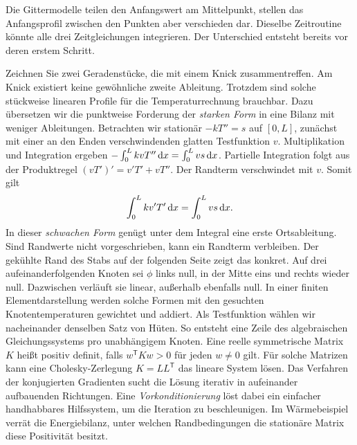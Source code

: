 Die Gittermodelle teilen den Anfangswert am Mittelpunkt, stellen das Anfangsprofil zwischen den Punkten aber verschieden dar. Dieselbe Zeitroutine könnte alle drei Zeitgleichungen integrieren. Der Unterschied entsteht bereits vor deren erstem Schritt.

Zeichnen Sie zwei Geradenstücke, die mit einem Knick zusammentreffen. Am Knick existiert keine gewöhnliche zweite Ableitung. Trotzdem sind solche stückweise linearen Profile für die Temperaturrechnung brauchbar. Dazu übersetzen wir die punktweise Forderung der \emph{starken Form} in eine Bilanz mit weniger Ableitungen.
Betrachten wir stationär \(-kT''=s\) auf \([0,L]\), zunächst mit einer an den Enden verschwindenden glatten Testfunktion \(v\). Multiplikation und Integration ergeben \(-\int_0^L kvT''\,\mathrm{d} x=\int_0^L vs\,\mathrm{d} x\). Partielle Integration folgt aus der Produktregel \((vT')'=v'T'+vT''\). Der Randterm verschwindet mit \(v\). Somit gilt
\[
 \int_0^L k v'T'\,\mathrm{d} x=\int_0^L vs\,\mathrm{d} x .
\]
In dieser \emph{schwachen Form} genügt unter dem Integral eine erste Ortsableitung. Sind Randwerte nicht vorgeschrieben, kann ein Randterm verbleiben. Der gekühlte Rand des Stabs auf der folgenden Seite zeigt das konkret.
Auf drei aufeinanderfolgenden Knoten sei \(\phi\) links null, in der Mitte eins und rechts wieder null. Dazwischen verläuft sie linear, außerhalb ebenfalls null. In einer finiten Elementdarstellung werden solche Formen mit den gesuchten Knotentemperaturen gewichtet und addiert. Als Testfunktion wählen wir nacheinander denselben Satz von Hüten. So entsteht eine Zeile des algebraischen Gleichungssystems pro unabhängigem Knoten.
Eine reelle symmetrische Matrix \(K\) heißt positiv definit, falls \(w^\mathsf T K w>0\) für jeden \(w\ne0\) gilt. Für solche Matrizen kann eine Cholesky-Zerlegung \(K=LL^\mathsf T\) das lineare System lösen. Das Verfahren der konjugierten Gradienten sucht die Lösung iterativ in aufeinander aufbauenden Richtungen. Eine \emph{Vorkonditionierung} löst dabei ein einfacher handhabbares Hilfssystem, um die Iteration zu beschleunigen. Im Wärmebeispiel verrät die Energiebilanz, unter welchen Randbedingungen die stationäre Matrix diese Positivität besitzt.


